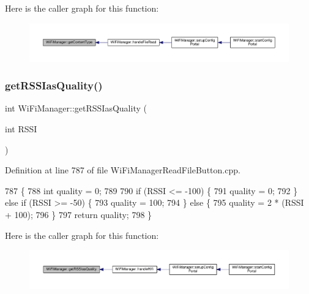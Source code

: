 Here is the caller graph for this function\+:\nopagebreak
\begin{figure}[H]
\begin{center}
\leavevmode
\includegraphics[width=350pt]{d4/dc8/class_wi_fi_manager_a40f123fd290c3e331c9785d19a88f3b8_icgraph}
\end{center}
\end{figure}
\mbox{\label{class_wi_fi_manager_ae71cfd6bd70ada2ca02e1d20b152d0e5}} 
\subsubsection{\texorpdfstring{get\+R\+S\+S\+Ias\+Quality()}{getRSSIasQuality()}}
{\footnotesize\ttfamily int Wi\+Fi\+Manager\+::get\+R\+S\+S\+Ias\+Quality (\begin{DoxyParamCaption}\item[{int}]{R\+S\+SI }\end{DoxyParamCaption})\hspace{0.3cm}{\ttfamily [private]}}



Definition at line 787 of file Wi\+Fi\+Manager\+Read\+File\+Button.\+cpp.


\begin{DoxyCode}
787                                           \{
788   \textcolor{keywordtype}{int} quality = 0;
789 
790   \textcolor{keywordflow}{if} (RSSI <= -100) \{
791     quality = 0;
792   \} \textcolor{keywordflow}{else} \textcolor{keywordflow}{if} (RSSI >= -50) \{
793     quality = 100;
794   \} \textcolor{keywordflow}{else} \{
795     quality = 2 * (RSSI + 100);
796   \}
797   \textcolor{keywordflow}{return} quality;
798 \}
\end{DoxyCode}
Here is the caller graph for this function\+:\nopagebreak
\begin{figure}[H]
\begin{center}
\leavevmode
\includegraphics[width=350pt]{d4/dc8/class_wi_fi_manager_ae71cfd6bd70ada2ca02e1d20b152d0e5_icgraph}
\end{center}
\end{figure}
\mbox{\label{class_wi_fi_manager_ac924dc071144e609afcf52073176c11f}} 
